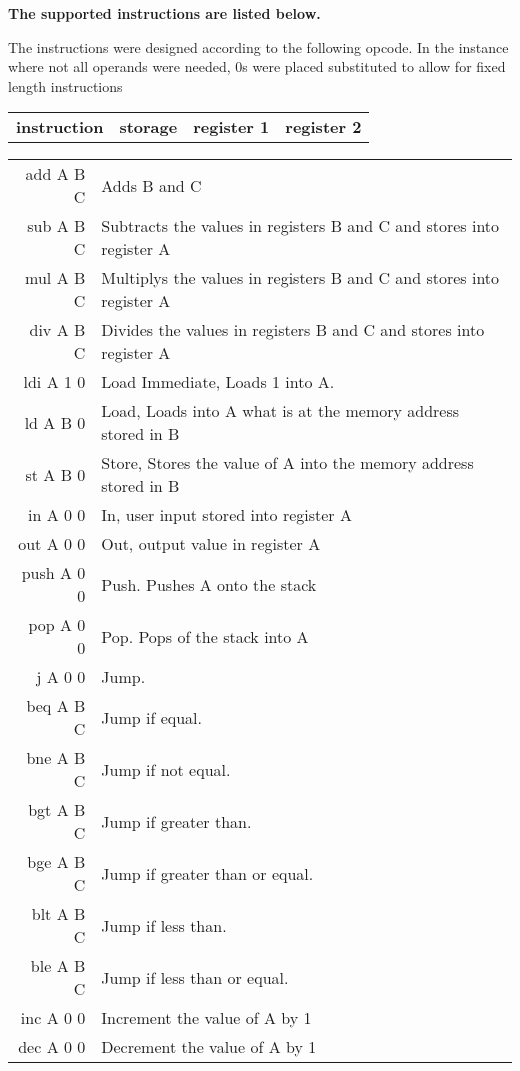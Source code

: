 \documentclass[12pt]{article}
\begin{document}
\centerline{\textbf{The supported instructions are listed below.}}

The instructions were designed according to the following opcode. In the instance where not all operands were needed, 0s were placed substituted to 
allow for fixed length instructions\\

\begin{tabular}{c | c | c | c}
\textbf{instruction} & \textbf{storage} & \textbf{register 1} & \textbf{register 2} \\
\end{tabular}


\begin{tabular}{ r | l } 
add A B C & Adds B and C  \\
sub A B C & Subtracts the values in registers B and C and stores into register A \\
mul A B C & Multiplys the values in registers B and C and stores into register A \\
div A B C & Divides the values in registers B and C and stores into register A \\
ldi A 1 0 & Load Immediate, Loads 1 into A. \\
ld A B 0 & Load, Loads into A what is at the memory address stored in B \\
st A B 0 & Store, Stores the value of A into the memory address stored in B \\
in A 0 0 & In, user input stored into register A \\ 
out A 0 0 & Out, output value in register A \\
push A 0 0 & Push. Pushes A onto the stack \\
pop A 0 0 & Pop. Pops of the stack into A \\
j A 0 0 & Jump. \\
beq A B C & Jump if equal. \\
bne A B C & Jump if not equal. \\
bgt A B C & Jump if greater than. \\
bge A B C & Jump if greater than or equal. \\
blt A B C & Jump if less than. \\
ble A B C & Jump if less than or equal. \\
inc A 0 0 & Increment the value of A by 1 \\
dec A 0 0 & Decrement the value of A by 1 \\
\end{tabular}
\end{document}
